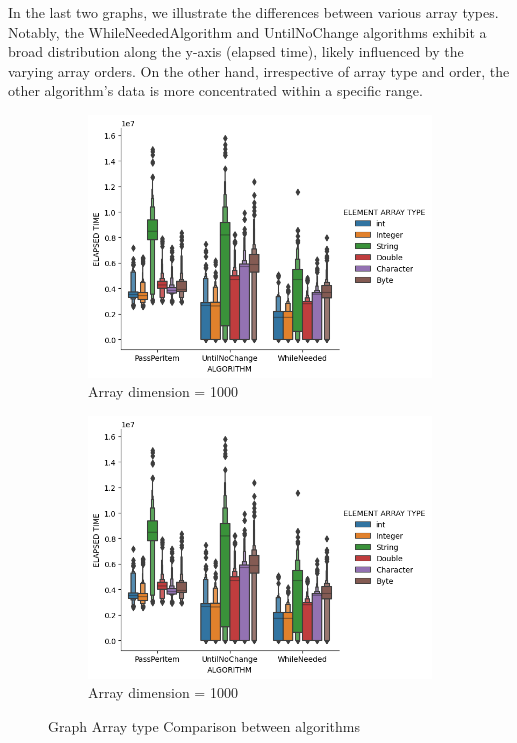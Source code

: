 \documentclass{article}
\begin{document}
In the last two graphs, we illustrate the differences between various array types. Notably, the WhileNeededAlgorithm and UntilNoChange algorithms exhibit a broad distribution along the y-axis (elapsed time), likely influenced by the varying array orders. On the other hand, irrespective of array type and order, the other algorithm's data is more concentrated within a specific range.\\
\begin{figure}[H]
    \centering
    \begin{subfigure}[b]{0.48\textwidth}
        \centering
        \includegraphics[width=\textwidth]{./data/array_type_1000.png}
        \caption{Array dimension = 1000}
    \end{subfigure}
    \hfill
    \begin{subfigure}[b]{0.48\textwidth}
        \centering
        \includegraphics[width=\textwidth]{./data/array_type_10000.png}
        \caption{Array dimension = 1000}
    \end{subfigure}
    \caption{Graph Array type Comparison between algorithms}
\end{figure}
\end{document}
